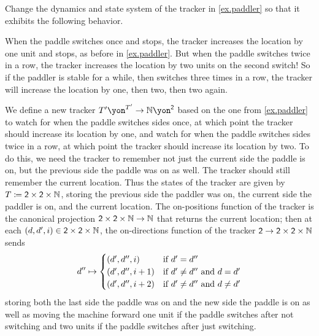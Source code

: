 \documentclass[Book-Poly]{subfiles}
\begin{document}
\begin{exercise}
Change the dynamics and state system of the tracker in \cref{ex.paddler} so that it exhibits the following behavior.

When the paddle switches once and stops, the tracker increases the location by one unit and stops, as before in \cref{ex.paddler}. But when the paddle switches twice in a row, the tracker increases the location by two units on the second switch! So if the paddler is stable for a while, then switches three times in a row, the tracker will increase the location by one, then two, then two again.
\begin{solution}
We define a new tracker $T'\yon^{T'}\to\nn\yon^\2$ based on the one from \cref{ex.paddler} to watch for when the paddle switches sides once, at which point the tracker should increase its location by one, and watch for when the paddle switches sides twice in a row, at which point the tracker should increase its location by two.
To do this, we need the tracker to remember not just the current side the paddle is on, but the previous side the paddle was on as well.
The tracker should still remember the current location.
Thus the states of the tracker are given by $T\coloneqq\textsf{2}\times\textsf{2}\times\mathbb{N}$, storing the previous side the paddler was on, the current side the paddler is on, and the current location.
The on-positions function of the tracker is the canonical projection $\textsf{2}\times\textsf{2}\times\mathbb{N}\to\mathbb{N}$ that returns the current location; then at each $(d,d',i)\in\textsf{2}\times\textsf{2}\times\mathbb{N}$, the on-directions function of the tracker $\textsf{2}\to\textsf{2}\times\textsf{2}\times\mathbb{N}$ sends
\[
  d''\mapsto
	\begin{cases}
		(d',d'',i)&\textnormal{if }d'=d''\\
		(d',d'',i+1)&\textnormal{if }d'\neq d''\textnormal{ and }d=d'\\
		(d',d'',i+2)&\textnormal{if }d'\neq d''\textnormal{ and }d\neq d'
	\end{cases}
\]
storing both the last side the paddle was on and the new side the paddle is on as well as moving the machine forward one unit if the paddle switches after not switching and two units if the paddle switches after just switching.
\end{solution}
\end{exercise}
\end{document}
